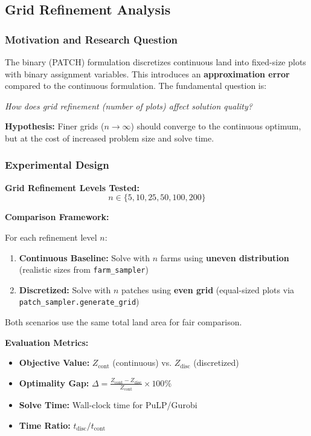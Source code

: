 \documentclass{article}
\begin{document}
\subsection{Grid Refinement Analysis}

\subsubsection{Motivation and Research Question}

The binary (PATCH) formulation discretizes continuous land into fixed-size plots with binary assignment variables. This introduces an \textbf{approximation error} compared to the continuous formulation. The fundamental question is:

\begin{center}
\textit{How does grid refinement (number of plots) affect solution quality?}
\end{center}

\textbf{Hypothesis:} Finer grids ($n \to \infty$) should converge to the continuous optimum, but at the cost of increased problem size and solve time.

\subsubsection{Experimental Design}

\textbf{Grid Refinement Levels Tested:}
$$n \in \{5, 10, 25, 50, 100, 200\}$$

\textbf{Comparison Framework:}

For each refinement level $n$:
\begin{enumerate}
    \item \textbf{Continuous Baseline:} Solve with $n$ farms using \textbf{uneven distribution} (realistic sizes from \texttt{farm\_sampler})
    \item \textbf{Discretized:} Solve with $n$ patches using \textbf{even grid} (equal-sized plots via \texttt{patch\_sampler.generate\_grid})
\end{enumerate}

Both scenarios use the same total land area for fair comparison.

\textbf{Evaluation Metrics:}
\begin{itemize}
    \item \textbf{Objective Value:} $Z_{\text{cont}}$ (continuous) vs. $Z_{\text{disc}}$ (discretized)
    \item \textbf{Optimality Gap:} $\Delta = \frac{Z_{\text{cont}} - Z_{\text{disc}}}{Z_{\text{cont}}} \times 100\%$
    \item \textbf{Solve Time:} Wall-clock time for PuLP/Gurobi
    \item \textbf{Time Ratio:} $t_{\text{disc}} / t_{\text{cont}}$
\end{itemize}
\end{document}
